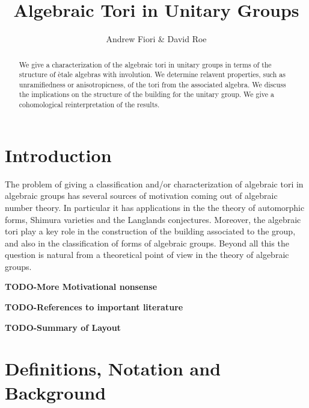 \documentclass{article}
\title{Algebraic Tori in Unitary Groups}
\author{Andrew Fiori \& David Roe}
\theoremstyle{plain}
\theoremstyle{definition}
\numberwithin{equation}{section}
\newcommand{\TODO}[1]{\textbf{TODO-#1}}
\begin{document}
\maketitle

\begin{abstract}
We give a characterization of the algebraic tori in unitary groups in terms of the structure of \`etale algebras with involution. We determine relavent properties, such as unramifiedness or anisotropicness, of the tori from the associated algebra. We discuss the implications on the structure of the building for the unitary group. We give a cohomological reinterpretation of the results.
\end{abstract}

\tableofcontents

\section{Introduction}

The problem of giving a classification and/or characterization of algebraic tori in algebraic groups has several sources of motivation coming out of algebraic number theory. In particular it has applications in the the theory of automorphic forms, Shimura varieties and the Langlands conjectures. Moreover, the algebraic tori play a key role in the construction of the building associated to the group, and also in the classification of forms of algebraic groups. Beyond all this the question is natural from a theoretical point of view in the theory of algebraic groups.  

\TODO{More Motivational nonsense}

\TODO{References to important literature}

\TODO{Summary of Layout}

\section{Definitions, Notation and Background}
\end{document}
